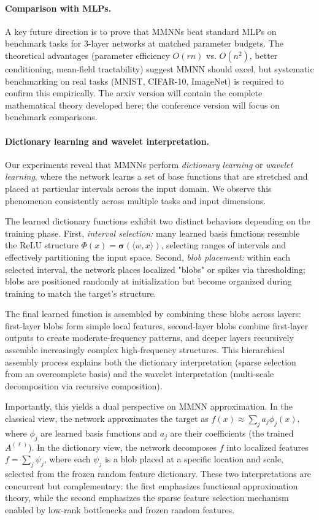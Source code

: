 \documentclass{article}
\DeclareRobustCommand{\ReLU}{\mathrel{\boldsymbol{\sigma}}}
\begin{document}
\paragraph{Comparison with MLPs.}
A key future direction is to prove that MMNNs beat standard MLPs on benchmark tasks for 3-layer networks at matched parameter budgets. The theoretical advantages (parameter efficiency \( O(rn) \) vs. \( O(n^2) \), better conditioning, mean-field tractability) suggest MMNN should excel, but systematic benchmarking on real tasks (MNIST, CIFAR-10, ImageNet) is required to confirm this empirically. The arxiv version will contain the complete mathematical theory developed here; the conference version will focus on benchmark comparisons.

\paragraph{Dictionary learning and wavelet interpretation.}
Our experiments reveal that MMNNs perform \emph{dictionary learning} or \emph{wavelet learning}, where the network learns a set of base functions that are stretched and placed at particular intervals across the input domain. We observe this phenomenon consistently across multiple tasks and input dimensions.

The learned dictionary functions exhibit two distinct behaviors depending on the training phase. First, \emph{interval selection:} many learned basis functions resemble the ReLU structure \( \Phi(x) = \ReLU(\langle w, x \rangle) \), selecting ranges of intervals and effectively partitioning the input space. Second, \emph{blob placement:} within each selected interval, the network places localized "blobs" or spikes via thresholding; blobs are positioned randomly at initialization but become organized during training to match the target's structure.

The final learned function is assembled by combining these blobs across layers: first-layer blobs form simple local features, second-layer blobs combine first-layer outputs to create moderate-frequency patterns, and deeper layers recursively assemble increasingly complex high-frequency structures. This hierarchical assembly process explains both the dictionary interpretation (sparse selection from an overcomplete basis) and the wavelet interpretation (multi-scale decomposition via recursive composition).

Importantly, this yields a dual perspective on MMNN approximation. In the classical view, the network approximates the target as \( f(x) \approx \sum_j a_j \phi_j(x) \), where \( \phi_j \) are learned basis functions and \( a_j \) are their coefficients (the trained \( A^{(\ell)} \)). In the dictionary view, the network decomposes \( f \) into localized features \( f = \sum_j \psi_j \), where each \( \psi_j \) is a blob placed at a specific location and scale, selected from the frozen random feature dictionary.
These two interpretations are concurrent but complementary: the first emphasizes functional approximation theory, while the second emphasizes the sparse feature selection mechanism enabled by low-rank bottlenecks and frozen random features.
\end{document}
